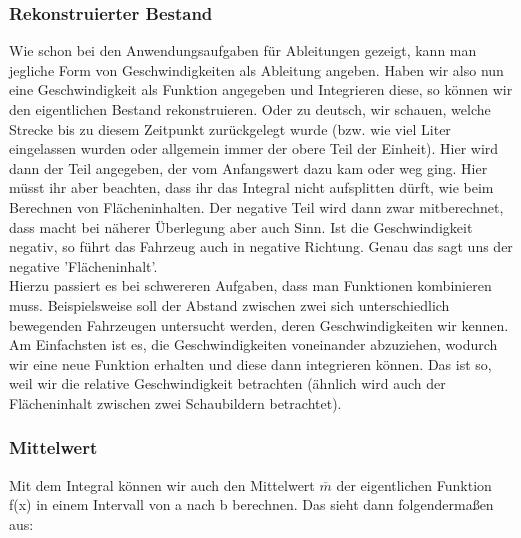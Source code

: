	\subsubsection{Rekonstruierter Bestand}
		Wie schon bei den Anwendungsaufgaben für Ableitungen gezeigt, kann man
		jegliche Form von Geschwindigkeiten als Ableitung angeben. Haben wir also nun
		eine Geschwindigkeit als Funktion angegeben und Integrieren diese, so können
		wir den eigentlichen Bestand rekonstruieren. Oder zu deutsch, wir schauen,
		welche Strecke bis zu diesem Zeitpunkt zurückgelegt wurde (bzw. wie viel Liter
		eingelassen wurden oder allgemein immer der obere Teil der Einheit). Hier wird
		dann der Teil angegeben, der vom Anfangswert dazu kam oder weg ging. Hier
		müsst ihr aber beachten, dass ihr das Integral nicht aufsplitten dürft, wie
		beim Berechnen von Flächeninhalten. Der negative Teil wird dann zwar
		mitberechnet, dass macht bei näherer Überlegung aber auch Sinn. Ist die
		Geschwindigkeit negativ, so führt das Fahrzeug auch in negative Richtung.
		Genau das sagt uns der negative 'Flächeninhalt'.\\
		Hierzu passiert es bei schwereren Aufgaben, dass man Funktionen kombinieren
		muss. Beispielsweise soll der Abstand zwischen zwei sich unterschiedlich
		bewegenden Fahrzeugen untersucht werden, deren Geschwindigkeiten wir kennen.
		Am Einfachsten ist es, die Geschwindigkeiten voneinander abzuziehen, wodurch
		wir eine neue Funktion erhalten und diese dann integrieren können. Das ist so,
		weil wir die relative Geschwindigkeit betrachten (ähnlich wird auch der
		Flächeninhalt zwischen zwei Schaubildern betrachtet).

	\subsubsection{Mittelwert}
		Mit dem Integral können wir auch den Mittelwert \(\overline{m}\) der
		eigentlichen Funktion f(x) in einem Intervall von a nach b berechnen. Das
		sieht dann folgendermaßen aus:
		\formel{\[\overline{m}=\frac{1}{b-a}\cdot \int\limits_a^b f(x)\]}
